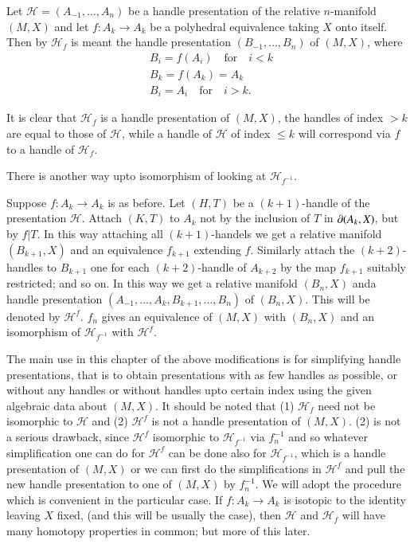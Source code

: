 Let $\mathscr{H}=(A_{-1},\ldots,A_{n})$ be a handle presentation of the relative $n$-manifold $(M,X)$ and let $f:A_{k}\to A_{k}$ be a polyhedral equivalence taking $X$ onto itself. Then by $\mathscr{H}_{f}$ is meant the handle presentation $(B_{-1},\ldots,B_{n})$ of $(M,X)$, where
\begin{align*}
& B_{i}=f(A_{i})\quad\text{for}\quad i<k\\
& B_{k}=f(A_{k})=A_{k}\\
& B_{i}=A_{i}\quad\text{for}\quad i>k.
\end{align*}

It is clear that $\mathscr{H}_{f}$ is a handle presentation of $(M,X)$, the handles of index $>k$ are equal to those of $\mathscr{H}$, while a handle of $\mathscr{H}$ of index $\leq k$ will correspond via $f$ to a handle of $\mathscr{H}_{f}$.

There is another way upto isomorphism of looking at $\mathscr{H}_{f^{-1}}$.

Suppose $f:A_{k}\to A_{k}$ is as before. Let $(H,T)$ be a $(k+1)$-handle of the presentation $\mathscr{H}$. Attach $(K,T)$ to $A_{k}$ not by the inclusion of $T$ in $\partial (A_{k},X)$, but by $f|T$. In this way attaching all $(k+1)$-handels we get a relative manifold $(B_{k+1},X)$ and an equivalence $f_{k+1}$ extending $f$. Similarly attach the $(k+2)$-handles to $B_{k+1}$ one for each $(k+2)$-handle of $A_{k+2}$ by the map $f_{k+1}$ suitably restricted; and so on. In this way we get a relative manifold $(B_{n},X)$ and\pageoriginale a handle presentation $(A_{-1},\ldots, A_{k},B_{k+1},\ldots,B_{n})$ of $(B_{n},X)$. This will be denoted by $\mathscr{H}^{f}$. $f_{n}$ gives an equivalence of $(M,X)$ with $(B_{n},X)$ and an isomorphism of $\mathscr{H}_{f^{-1}}$ with $\mathscr{H}^{f}$.

The main use in this chapter of the above modifications is for simplifying handle presentations, that is to obtain presentations with as few handles as possible, or without any handles or without handles upto certain index using the given algebraic data about $(M,X)$. It should be noted that (1) $\mathscr{H}_{f}$ need not be isomorphic to $\mathscr{H}$ and (2) $\mathscr{H}^{f}$ is not a handle presentation of $(M,X)$. (2) is not a serious drawback, since $\mathscr{H}^{f}$ isomorphic to $\mathscr{H}_{f^{-1}}$ via $f^{-1}_{n}$ and so whatever simplification one can do for $\mathscr{H}^{f}$ can be done also for $\mathscr{H}_{f^{-1}}$, which  is a handle presentation of $(M,X)$ or we can first do the simplifications in $\mathscr{H}^{f}$ and pull the new handle presentation to one of $(M,X)$ by $f^{-1}_{n}$. We will adopt the procedure which is convenient in the particular case.
If $f:A_{k}\to A_{k}$ is isotopic to the identity leaving $X$ fixed, (and this will be usually the case), then $\mathscr{H}$ and $\mathscr{H}_{f}$ will have many homotopy properties in common; but more of this later.

